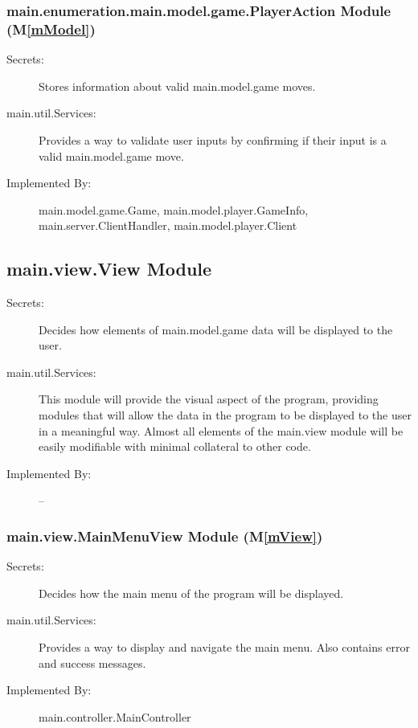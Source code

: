 \documentclass[12pt, titlepage]{article}
\newcommand{\mref}[1]{M\ref{#1}}
\begin{document}
\subsubsection{ main.enumeration.main.model.game.PlayerAction Module (\mref{mModel})}
    \begin{description}
    \item[Secrets:] Stores information about valid main.model.game moves.
    \item[main.util.Services:] Provides a way to validate user inputs by confirming if their input is a valid main.model.game move.
    \item[Implemented By:] main.model.game.Game, main.model.player.GameInfo, main.server.ClientHandler, main.model.player.Client
    \end{description}

\subsection{main.view.View Module}
    \begin{description}
    \item[Secrets:] Decides how elements of main.model.game data will be displayed to the user.
    \item[main.util.Services:] This module will provide the visual aspect of the program, providing modules that will allow the data in the program to be displayed to the user in a meaningful way. Almost all elements of the main.view module will be easily modifiable with minimal collateral to other code.
    \item[Implemented By:] --
    \end{description}

\subsubsection{ main.view.MainMenuView Module (\mref{mView})}
    \begin{description}
    \item[Secrets:] Decides how the main menu of the program will be displayed.
    \item[main.util.Services:] Provides a way to display and navigate the main menu. Also contains error and success messages.
    \item[Implemented By:] main.controller.MainController
    \end{description}
    
\end{document}

